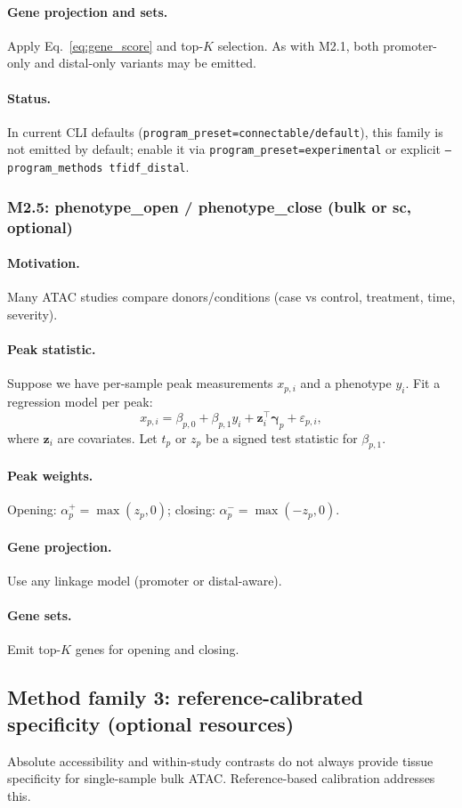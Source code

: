 \documentclass[11pt]{article}
\begin{document}
\paragraph{Gene projection and sets.} Apply Eq.\ \ref{eq:gene_score} and top-$K$ selection. As with M2.1, both promoter-only and distal-only variants may be emitted.
\paragraph{Status.} In current CLI defaults (\texttt{program\_preset=connectable/default}), this family is not emitted by default; enable it via \texttt{program\_preset=experimental} or explicit \texttt{--program\_methods tfidf\_distal}.

\subsubsection{M2.5: phenotype\_open / phenotype\_close (bulk or sc, optional)}
\paragraph{Motivation.} Many ATAC studies compare donors/conditions (case vs control, treatment, time, severity).
\paragraph{Peak statistic.} Suppose we have per-sample peak measurements $x_{p,i}$ and a phenotype $y_i$.
Fit a regression model per peak:
\[
x_{p,i} = \beta_{p,0} + \beta_{p,1} y_i + \mathbf{z}_i^\top \boldsymbol{\gamma}_p + \varepsilon_{p,i},
\]
where $\mathbf{z}_i$ are covariates. Let $t_p$ or $z_p$ be a signed test statistic for $\beta_{p,1}$.
\paragraph{Peak weights.} Opening: $\alpha_p^{+} = \max(z_p,0)$; closing: $\alpha_p^{-} = \max(-z_p,0)$.
\paragraph{Gene projection.} Use any linkage model (promoter or distal-aware).
\paragraph{Gene sets.} Emit top-$K$ genes for opening and closing.

\subsection{Method family 3: reference-calibrated specificity (optional resources)}
Absolute accessibility and within-study contrasts do not always provide tissue specificity for single-sample bulk ATAC. Reference-based calibration addresses this.
\end{document}
